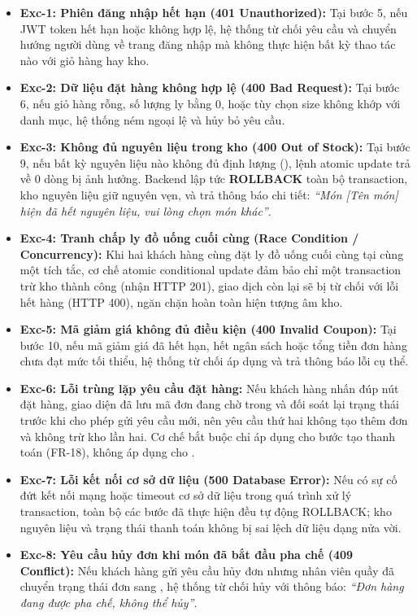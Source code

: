 \begin{itemize}[leftmargin=1.5em]
  \item \textbf{Exc-1: Phiên đăng nhập hết hạn (401 Unauthorized):} Tại bước 5, nếu JWT token hết hạn hoặc không hợp lệ, hệ thống từ chối yêu cầu và chuyển hướng người dùng về trang đăng nhập mà không thực hiện bất kỳ thao tác nào với giỏ hàng hay kho.
  \item \textbf{Exc-2: Dữ liệu đặt hàng không hợp lệ (400 Bad Request):} Tại bước 6, nếu giỏ hàng rỗng, số lượng ly bằng 0, hoặc tùy chọn size không khớp với danh mục, hệ thống ném ngoại lệ  và hủy bỏ yêu cầu.
  \item \textbf{Exc-3: Không đủ nguyên liệu trong kho (400 Out of Stock):} Tại bước 9, nếu bất kỳ nguyên liệu nào không đủ định lượng (), lệnh atomic update trả về 0 dòng bị ảnh hưởng. Backend lập tức \textbf{ROLLBACK} toàn bộ transaction, kho nguyên liệu giữ nguyên vẹn, và trả thông báo chi tiết: \textit{``Món [Tên món] hiện đã hết nguyên liệu, vui lòng chọn món khác''}.
  \item \textbf{Exc-4: Tranh chấp ly đồ uống cuối cùng (Race Condition / Concurrency):} Khi hai khách hàng cùng đặt ly đồ uống cuối cùng tại cùng một tích tắc, cơ chế atomic conditional update đảm bảo chỉ một transaction trừ kho thành công (nhận HTTP 201), giao dịch còn lại sẽ bị từ chối với lỗi hết hàng (HTTP 400), ngăn chặn hoàn toàn hiện tượng âm kho.
  \item \textbf{Exc-5: Mã giảm giá không đủ điều kiện (400 Invalid Coupon):} Tại bước 10, nếu mã giảm giá đã hết hạn, hết ngân sách hoặc tổng tiền đơn hàng chưa đạt mức tối thiểu, hệ thống từ chối áp dụng và trả thông báo lỗi cụ thể.
  \item \textbf{Exc-6: Lỗi trùng lặp yêu cầu đặt hàng:} Nếu khách hàng nhấn đúp nút đặt hàng, giao diện đã lưu mã đơn đang chờ trong  và đối soát lại trạng thái trước khi cho phép gửi yêu cầu mới, nên yêu cầu thứ hai không tạo thêm đơn và không trừ kho lần hai. Cơ chế  bắt buộc chỉ áp dụng cho bước tạo thanh toán (FR-18), không áp dụng cho .
  \item \textbf{Exc-7: Lỗi kết nối cơ sở dữ liệu (500 Database Error):} Nếu có sự cố đứt kết nối mạng hoặc timeout cơ sở dữ liệu trong quá trình xử lý transaction, toàn bộ các bước đã thực hiện đều tự động ROLLBACK; kho nguyên liệu và trạng thái thanh toán không bị sai lệch dữ liệu dạng nửa vời.
  \item \textbf{Exc-8: Yêu cầu hủy đơn khi món đã bắt đầu pha chế (409 Conflict):} Nếu khách hàng gửi yêu cầu hủy đơn nhưng nhân viên quầy đã chuyển trạng thái đơn sang , hệ thống từ chối hủy với thông báo: \textit{``Đơn hàng đang được pha chế, không thể hủy''}.

\end{itemize}

